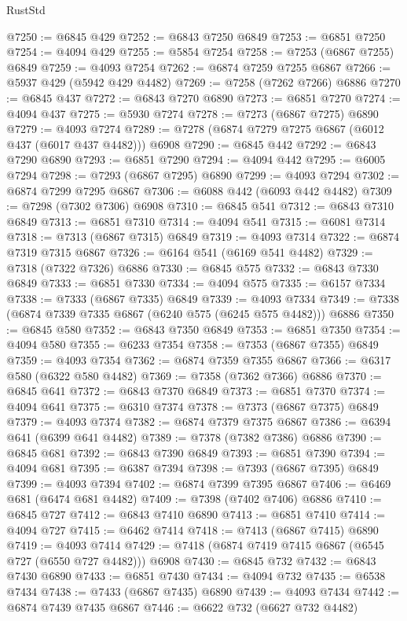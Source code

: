 \begin{lexlean}{RustStd}
\begin{coremodule}
@7250 := @6845 @429
@7252 := @6843 @7250 @6849
@7253 := @6851 @7250
@7254 := @4094 @429
@7255 := @5854 @7254
@7258 := @7253 (@6867 @7255) @6849
@7259 := @4093 @7254
@7262 := @6874 @7259 @7255 @6867
@7266 := @5937 @429 (@5942 @429 @4482)
@7269 := @7258 (@7262 @7266) @6886
@7270 := @6845 @437
@7272 := @6843 @7270 @6890
@7273 := @6851 @7270
@7274 := @4094 @437
@7275 := @5930 @7274
@7278 := @7273 (@6867 @7275) @6890
@7279 := @4093 @7274
@7289 := @7278 (@6874 @7279 @7275 @6867 (@6012 @437 (@6017 @437 @4482))) @6908
@7290 := @6845 @442
@7292 := @6843 @7290 @6890
@7293 := @6851 @7290
@7294 := @4094 @442
@7295 := @6005 @7294
@7298 := @7293 (@6867 @7295) @6890
@7299 := @4093 @7294
@7302 := @6874 @7299 @7295 @6867
@7306 := @6088 @442 (@6093 @442 @4482)
@7309 := @7298 (@7302 @7306) @6908
@7310 := @6845 @541
@7312 := @6843 @7310 @6849
@7313 := @6851 @7310
@7314 := @4094 @541
@7315 := @6081 @7314
@7318 := @7313 (@6867 @7315) @6849
@7319 := @4093 @7314
@7322 := @6874 @7319 @7315 @6867
@7326 := @6164 @541 (@6169 @541 @4482)
@7329 := @7318 (@7322 @7326) @6886
@7330 := @6845 @575
@7332 := @6843 @7330 @6849
@7333 := @6851 @7330
@7334 := @4094 @575
@7335 := @6157 @7334
@7338 := @7333 (@6867 @7335) @6849
@7339 := @4093 @7334
@7349 := @7338 (@6874 @7339 @7335 @6867 (@6240 @575 (@6245 @575 @4482))) @6886
@7350 := @6845 @580
@7352 := @6843 @7350 @6849
@7353 := @6851 @7350
@7354 := @4094 @580
@7355 := @6233 @7354
@7358 := @7353 (@6867 @7355) @6849
@7359 := @4093 @7354
@7362 := @6874 @7359 @7355 @6867
@7366 := @6317 @580 (@6322 @580 @4482)
@7369 := @7358 (@7362 @7366) @6886
@7370 := @6845 @641
@7372 := @6843 @7370 @6849
@7373 := @6851 @7370
@7374 := @4094 @641
@7375 := @6310 @7374
@7378 := @7373 (@6867 @7375) @6849
@7379 := @4093 @7374
@7382 := @6874 @7379 @7375 @6867
@7386 := @6394 @641 (@6399 @641 @4482)
@7389 := @7378 (@7382 @7386) @6886
@7390 := @6845 @681
@7392 := @6843 @7390 @6849
@7393 := @6851 @7390
@7394 := @4094 @681
@7395 := @6387 @7394
@7398 := @7393 (@6867 @7395) @6849
@7399 := @4093 @7394
@7402 := @6874 @7399 @7395 @6867
@7406 := @6469 @681 (@6474 @681 @4482)
@7409 := @7398 (@7402 @7406) @6886
@7410 := @6845 @727
@7412 := @6843 @7410 @6890
@7413 := @6851 @7410
@7414 := @4094 @727
@7415 := @6462 @7414
@7418 := @7413 (@6867 @7415) @6890
@7419 := @4093 @7414
@7429 := @7418 (@6874 @7419 @7415 @6867 (@6545 @727 (@6550 @727 @4482))) @6908
@7430 := @6845 @732
@7432 := @6843 @7430 @6890
@7433 := @6851 @7430
@7434 := @4094 @732
@7435 := @6538 @7434
@7438 := @7433 (@6867 @7435) @6890
@7439 := @4093 @7434
@7442 := @6874 @7439 @7435 @6867
@7446 := @6622 @732 (@6627 @732 @4482)

\end{coremodule}
\end{lexlean}
